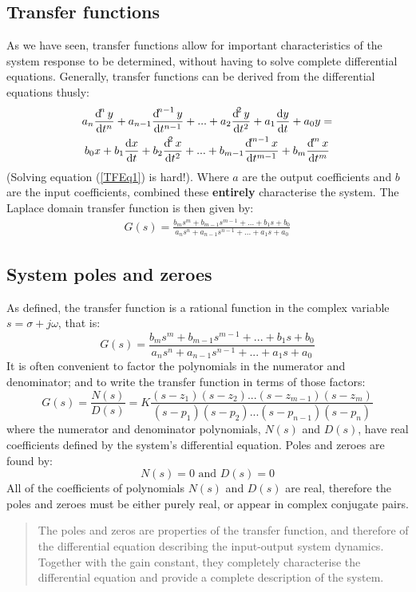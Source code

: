 \documentclass[class=report, crop=false, 12pt,a4paper]{standalone}
\begin{document}
\subsection{Transfer functions}
As we have seen, transfer functions allow for important characteristics of the system response to be determined, without having to solve complete differential equations. Generally, transfer functions can be derived from the differential equations thusly: 
\begin{multline}
  a_n \frac{\dif^n y}{\dif t^n} + a_{n-1}\frac{\dif^{n-1} y}{\dif t^{n-1}} + ... + a_2 \frac{\dif^2 y}{\dif t^2} + a_1 \frac{\dif y}{\dif t} + a_0 y =\\ b_0 x + b_1 \frac{\dif x}{\dif t} + b_2 \frac{\dif^2 x}{\dif t^2} + ... + b_{m-1}\frac{\dif^{m-1} x}{\dif t^{m-1}} + b_m \frac{\dif^{m} x}{\dif t^m} \label{TFEq1}
\end{multline}
(Solving equation (\ref{TFEq1}) is hard!). Where $a$ are the output coefficients and $b$ are the input coefficients, combined these \textbf{entirely} characterise the system. The Laplace domain transfer function is then given by:
\begin{align}
  G(s) = \frac{b_m s^m + b_{m-1} s^{m-1} + ... + b_1 s + b_0}{a_n s^n + a_{n-1} s^{n-1} + ... + a_1 s + a_0}
\end{align}
\subsection{System poles and zeroes}
As defined, the transfer function is a rational function in the complex variable $s=\sigma + j\omega$, that is:
\begin{equation}
  G(s) = \frac{b_m s^m + b_{m-1} s^{m-1} + ... + b_1 s + b_0}{a_n s^n + a_{n-1} s^{n-1} + ... + a_1 s + a_0}
\end{equation}
It is often convenient to factor the polynomials in the numerator and denominator; and to write the transfer function in terms of those factors:
\begin{equation}
  G(s) = \frac{N(s)}{D(s)} = K\frac{(s-z_1)(s-z_2)...(s-z_{m-1})(s-z_m)}{(s-p_1)(s-p_2)...(s-p_{n-1})(s-p_n)}
\end{equation}
where the numerator and denominator polynomials, $N(s)$ and $D(s)$, have real coefficients defined by the system's differential equation. Poles and zeroes are found by:
\begin{equation}
  N(s) = 0 \textrm{ and } D(s) = 0
\end{equation}
All of the coefficients of polynomials $N(s)$ and $D(s)$ are real, therefore the poles and zeroes must be either purely real, or appear in complex conjugate pairs.
\begin{quotation}
  The poles and zeros are properties of the transfer function, and therefore of the differential equation describing the input-output system dynamics. Together with the gain constant, they completely characterise the differential equation and provide a complete description of the system.
\end{quotation}
\end{document}
